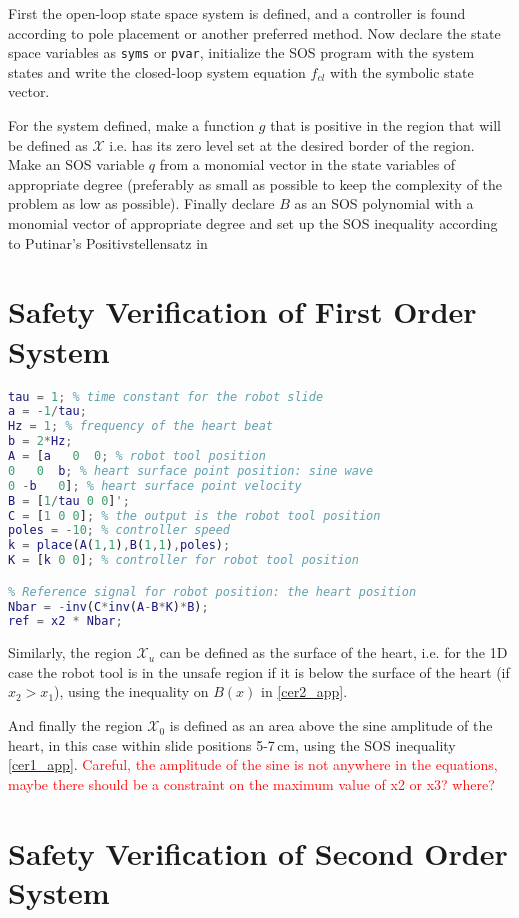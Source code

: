 First the open-loop state space system is defined, and a controller is found according to pole placement or another preferred method. Now declare the state space variables as \verb|syms| or \verb|pvar|, initialize the SOS program with the system states and write the closed-loop system equation $f_{cl}$ with the symbolic state vector.

For the system defined, make a function $g$ that is positive in the region that will be defined as $\mathcal{X}$ i.e. has its zero level set at the desired border of the region. Make an SOS variable $q$ from a monomial vector in the state variables of appropriate degree (preferably as small as possible to keep the complexity of the problem as low as possible). Finally declare $B$ as an SOS polynomial with a monomial vector of appropriate degree and set up the SOS inequality according to Putinar's Positivstellensatz in


\section{Safety Verification of First Order System}
\begin{lstlisting}[language=matlab]
% Define state-space system with x1 = robot position, x2 = heart position, x3 = heart velocity
tau = 1; % time constant for the robot slide
a = -1/tau;
Hz = 1; % frequency of the heart beat
b = 2*Hz;
A = [a   0  0; % robot tool position
0   0  b; % heart surface point position: sine wave
0 -b   0]; % heart surface point velocity
B = [1/tau 0 0]';
C = [1 0 0]; % the output is the robot tool position
poles = -10; % controller speed
k = place(A(1,1),B(1,1),poles);
K = [k 0 0]; % controller for robot tool position

% Reference signal for robot position: the heart position
Nbar = -inv(C*inv(A-B*K)*B);
ref = x2 * Nbar;
\end{lstlisting}

Similarly, the region $\mathcal{X}_u$ can be defined as the surface of the heart, i.e. for the 1D case the robot tool is in the unsafe region if it is below the surface of the heart (if $x_2>x_1$), using the inequality on $B(x)$ in \autoref{cer2_app}.

And finally the region $\mathcal{X}_0$ is defined as an area above the sine amplitude of the heart, in this case within slide positions 5-7\,cm, using the SOS inequality \autoref{cer1_app}. 
\textcolor{red}{Careful, the amplitude of the sine is not anywhere in the equations, maybe there should be a constraint on the maximum value of x2 or x3? where?}

\section{Safety Verification of Second Order System}